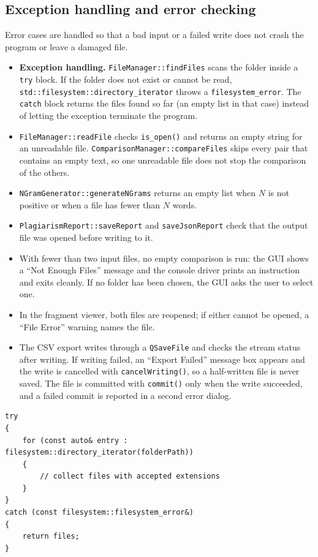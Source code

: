 \documentclass[12pt,a4paper,oneside]{book}
\begin{document}
\subsection{Exception handling and error checking}
Error cases are handled so that a bad input or a failed write does not crash the program or leave a damaged file.
\begin{itemize}
  \item \textbf{Exception handling.} \texttt{FileManager::findFiles} scans the folder inside a \texttt{try} block. If the folder does not exist or cannot be read, \texttt{std::filesystem::directory\_iterator} throws a \texttt{filesystem\_error}. The \texttt{catch} block returns the files found so far (an empty list in that case) instead of letting the exception terminate the program.
  \item \texttt{FileManager::readFile} checks \texttt{is\_open()} and returns an empty string for an unreadable file. \texttt{ComparisonManager::compareFiles} skips every pair that contains an empty text, so one unreadable file does not stop the comparison of the others.
  \item \texttt{NGramGenerator::generateNGrams} returns an empty list when $N$ is not positive or when a file has fewer than $N$ words.
  \item \texttt{PlagiarismReport::saveReport} and \texttt{saveJsonReport} check that the output file was opened before writing to it.
  \item With fewer than two input files, no empty comparison is run: the GUI shows a ``Not Enough Files'' message and the console driver prints an instruction and exits cleanly. If no folder has been chosen, the GUI asks the user to select one.
  \item In the fragment viewer, both files are reopened; if either cannot be opened, a ``File Error'' warning names the file.
  \item The CSV export writes through a \texttt{QSaveFile} and checks the stream status after writing. If writing failed, an ``Export Failed'' message box appears and the write is cancelled with \texttt{cancelWriting()}, so a half-written file is never saved. The file is committed with \texttt{commit()} only when the write succeeded, and a failed commit is reported in a second error dialog.
\end{itemize}

\begin{lstlisting}[caption={Exception handling in FileManager::findFiles.}, label={lst:try}]
try
{
    for (const auto& entry : filesystem::directory_iterator(folderPath))
    {
        // collect files with accepted extensions
    }
}
catch (const filesystem::filesystem_error&)
{
    return files;
}
\end{lstlisting}
\end{document}
